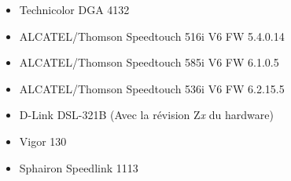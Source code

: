 \begin{itemize}
\item Technicolor DGA 4132
\end{itemize}

\begin{itemize}
\item ALCATEL/Thomson Speedtouch 516i V6 FW 5.4.0.14
\item ALCATEL/Thomson Speedtouch 585i V6 FW 6.1.0.5
\item ALCATEL/Thomson Speedtouch 536i V6 FW 6.2.15.5
\end{itemize}

\begin{itemize}
\item D-Link DSL-321B
(Avec la révision Z\emph{x} du hardware)
\end{itemize}

\begin{itemize}
\item Vigor 130
\end{itemize}

\begin{itemize}
\item Sphairon Speedlink 1113
\end{itemize}


